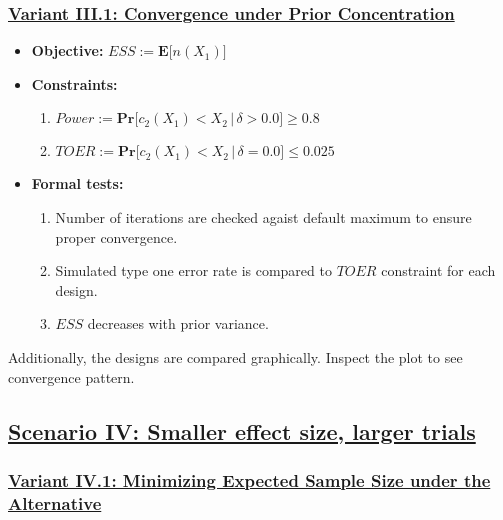 \documentclass[]{book}
\providecommand{\tightlist}{%
  \setlength{\itemsep}{0pt}\setlength{\parskip}{0pt}}
\begin{document}
\hypertarget{variant-iii.1-convergence-under-prior-concentration}{%
\subsubsection{\texorpdfstring{\protect\hyperlink{variantIII_1}{Variant III.1: Convergence under Prior Concentration}}{Variant III.1: Convergence under Prior Concentration}}\label{variant-iii.1-convergence-under-prior-concentration}}

\begin{itemize}
\tightlist
\item
  \textbf{Objective:} \(ESS := \boldsymbol{E}\big[n(X_1)\big]\)
\item
  \textbf{Constraints:}

  \begin{enumerate}
  \def\labelenumi{\arabic{enumi}.}
  \tightlist
  \item
    \(Power := \boldsymbol{Pr}\big[c_2(X_1) < X_2\,|\,\delta>0.0\big] \geq 0.8\)
  \item
    \(TOER := \boldsymbol{Pr}\big[c_2(X_1) < X_2\,|\,\delta=0.0\big] \leq 0.025\)
  \end{enumerate}
\item
  \textbf{Formal tests:}

  \begin{enumerate}
  \def\labelenumi{\arabic{enumi}.}
  \tightlist
  \item
    Number of iterations are checked agaist default maximum to ensure proper
    convergence.
  \item
    Simulated type one error rate is compared to \(TOER\) constraint for each
    design.
  \item
    \(ESS\) decreases with prior variance.
  \end{enumerate}
\end{itemize}

Additionally, the designs are compared graphically.
Inspect the plot to see convergence pattern.

\hypertarget{scenario-iv-smaller-effect-size-larger-trials}{%
\subsection{\texorpdfstring{\protect\hyperlink{scenarioIV}{Scenario IV: Smaller effect size, larger trials}}{Scenario IV: Smaller effect size, larger trials}}\label{scenario-iv-smaller-effect-size-larger-trials}}

\hypertarget{variant-iv.1-minimizing-expected-sample-size-under-the-alternative}{%
\subsubsection{\texorpdfstring{\protect\hyperlink{variantIV_1}{Variant IV.1: Minimizing Expected Sample Size under the Alternative}}{Variant IV.1: Minimizing Expected Sample Size under the Alternative}}\label{variant-iv.1-minimizing-expected-sample-size-under-the-alternative}}
\end{document}
